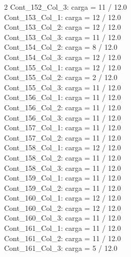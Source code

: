 \begin{multicols}{2}
Cont\_152\_Col\_3: carga = 11 / 12.0\\
Cont\_153\_Col\_1: carga = 12 / 12.0\\
Cont\_153\_Col\_2: carga = 12 / 12.0\\
Cont\_153\_Col\_3: carga = 11 / 12.0\\
Cont\_154\_Col\_2: carga = 8 / 12.0\\
Cont\_154\_Col\_3: carga = 12 / 12.0\\
Cont\_155\_Col\_1: carga = 12 / 12.0\\
Cont\_155\_Col\_2: carga = 2 / 12.0\\
Cont\_155\_Col\_3: carga = 11 / 12.0\\
Cont\_156\_Col\_1: carga = 11 / 12.0\\
Cont\_156\_Col\_2: carga = 11 / 12.0\\
Cont\_156\_Col\_3: carga = 11 / 12.0\\
Cont\_157\_Col\_1: carga = 11 / 12.0\\
Cont\_157\_Col\_2: carga = 11 / 12.0\\
Cont\_158\_Col\_1: carga = 12 / 12.0\\
Cont\_158\_Col\_2: carga = 11 / 12.0\\
Cont\_158\_Col\_3: carga = 11 / 12.0\\
Cont\_159\_Col\_1: carga = 11 / 12.0\\
Cont\_159\_Col\_2: carga = 11 / 12.0\\
Cont\_160\_Col\_1: carga = 12 / 12.0\\
Cont\_160\_Col\_2: carga = 12 / 12.0\\
Cont\_160\_Col\_3: carga = 11 / 12.0\\
Cont\_161\_Col\_1: carga = 11 / 12.0\\
Cont\_161\_Col\_2: carga = 11 / 12.0\\
Cont\_161\_Col\_3: carga = 5 / 12.0\\
\end{multicols}

